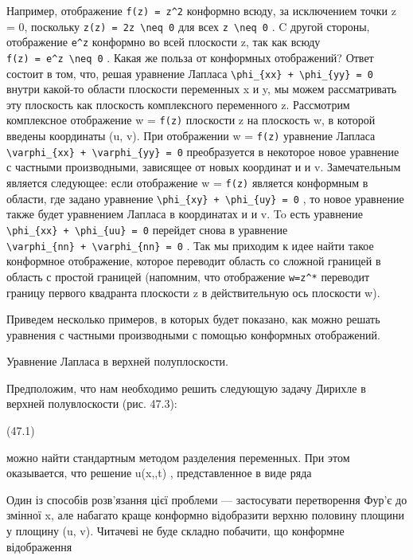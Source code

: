 \documentclass[
  ukrainian,
]{article}
\begin{document}
Например, отображение \texttt{f(z)\ =\ z\^{}2} конформно всюду, за
исключением точки z = 0, поскольку
\texttt{z\textquotesingle{}(z)\ =\ 2z\ \textbackslash{}neq\ 0} для всех
\texttt{z\ \textbackslash{}neq\ 0} . C другой стороны, отображение
\texttt{e\^{}z} конформно во всей плоскости z, так как всюду
\texttt{f\textquotesingle{}(z)\ =\ e\^{}z\ \textbackslash{}neq\ 0} .
Какая же польза от конформных отображений? Ответ состоит в том, что,
решая уравнение Лапласа
\texttt{\textbackslash{}phi\_\{xx\}\ +\ \textbackslash{}phi\_\{yy\}\ =\ 0}
внутри какой-то области плоскости переменных x и y, мы можем
рассматривать эту плоскость как плоскость комплексного переменного z.
Рассмотрим комплексное отображение w = \texttt{f(z)} плоскости z на
плоскость w, в которой введены координаты (u, v). При отображении w =
\texttt{f(z)} уравнение Лапласа
\texttt{\textbackslash{}varphi\_\{xx\}\ +\ \textbackslash{}varphi\_\{yy\}\ =\ 0}
преобразуется в некоторое новое уравнение с частными производными,
зависящее от новых координат и и v. Замечательным является следующее:
если отображение w = \texttt{f(z)} является конформным в области, где
задано уравнение
\texttt{\textbackslash{}phi\_\{xy\}\ +\ \textbackslash{}phi\_\{uy\}\ =\ 0}
, то новое уравнение также будет уравнением Лапласа в координатах и и v.
To есть уравнение
\texttt{\textbackslash{}phi\_\{xx\}\ +\ \textbackslash{}phi\_\{uu\}\ =\ 0}
перейдет снова в уравнение
\texttt{\textbackslash{}varphi\_\{nn\}\ +\ \textbackslash{}varphi\_\{nn\}\ =\ 0}
. Так мы приходим к идее найти такое конформное отображение, которое
переводит область со сложной границей в область с простой границей
(напомним, что отображение \texttt{w=z\^{}*} переводит границу первого
квадранта плоскости z в действительную ось плоскости w).

Приведем несколько примеров, в которых будет показано, как можно решать
уравнения с частными производными с помощью конформных отображений.

Уравнение Лапласа в верхней полуплоскости.

Предположим, что нам необходимо решить следующую задачу Дирихле в
верхней полувлоскости (рис. 47.3):

(47.1)

можно найти стандартным методом разделения переменных. При этом
оказывается, что решение u\left(x,,t\right) , представленное в виде ряда

Один із способів розв'язання цієї проблеми --- застосувати перетворення
Фур'є до змінної x, але набагато краще конформно відобразити верхню
половину площини у площину (u, v). Читачеві не буде складно побачити, що
конформне відображення
\end{document}
